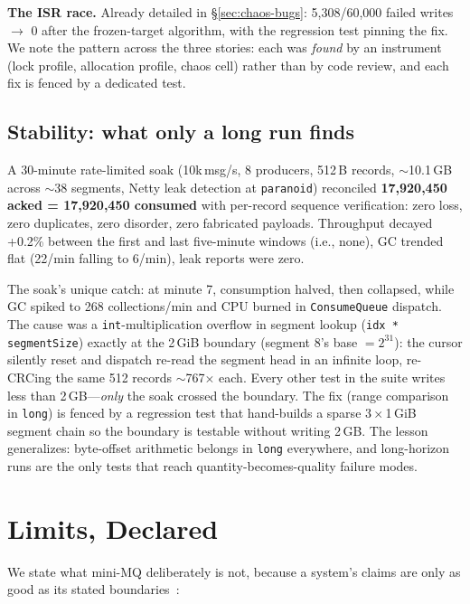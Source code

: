 \documentclass[letterpaper,twocolumn,10pt]{article}
\begin{document}
\textbf{The ISR race.} Already detailed in
\S\ref{sec:chaos-bugs}: 5{,}308/60{,}000 failed writes
$\rightarrow$ 0 after the frozen-target algorithm, with the regression
test pinning the fix. We note the pattern across the three stories:
each was \emph{found} by an instrument (lock profile, allocation
profile, chaos cell) rather than by code review, and each fix is fenced
by a dedicated test.

\subsection{Stability: what only a long run finds}
\label{sec:stability}

A 30-minute rate-limited soak (10k\,msg/s, 8 producers, 512\,B records,
${\sim}$10.1\,GB across ${\sim}$38 segments, Netty leak detection at
\texttt{paranoid}) reconciled \textbf{17{,}920{,}450 acked =
17{,}920{,}450 consumed} with per-record sequence verification:
zero loss, zero duplicates, zero disorder, zero fabricated payloads.
Throughput decayed +0.2\% between the first and last five-minute
windows (i.e., none), GC trended flat (22/min falling to 6/min), leak
reports were zero.

The soak's unique catch: at minute 7, consumption halved, then
collapsed, while GC spiked to 268 collections/min and CPU burned in
\texttt{ConsumeQueue} dispatch. The cause was a
\texttt{int}-multiplication overflow in segment lookup
(\texttt{idx * segmentSize}) exactly at the 2\,GiB boundary (segment
8's base $=2^{31}$): the cursor silently reset and dispatch re-read
the segment head in an infinite loop, re-CRCing the same 512 records
${\sim}$767$\times$ each. Every other test in the suite writes less
than 2\,GB---\emph{only} the soak crossed the boundary. The fix (range
comparison in \texttt{long}) is fenced by a regression test that
hand-builds a sparse $3\times$1\,GiB segment chain so the boundary is
testable without writing 2\,GB. The lesson generalizes: byte-offset
arithmetic belongs in \texttt{long} everywhere, and long-horizon runs
are the only tests that reach quantity-becomes-quality failure modes.

\section{Limits, Declared}
We state what mini-MQ deliberately is not, because a system's claims
are only as good as its stated boundaries~\cite{nygard11adr}:
\end{document}
